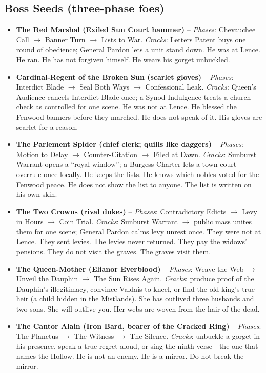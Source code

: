\subsection*{Boss Seeds (three-phase foes)}
\begin{itemize}
  \item \textbf{The Red Marshal (Exiled Sun Court hammer)} -- \emph{Phases}: Chevauchee Call $\rightarrow$ Banner Turn $\rightarrow$ Lists to War. \emph{Cracks}: Letters Patent buys one round of obedience; General Pardon lets a unit stand down. He was at Lence. He ran. He has not forgiven himself. He wears his gorget unbuckled.
  \item \textbf{Cardinal-Regent of the Broken Sun (scarlet gloves)} -- \emph{Phases}: Interdict Blade $\rightarrow$ Seal Both Ways $\rightarrow$ Confessional Leak. \emph{Cracks}: Queen's Audience cancels Interdict Blade once; a Synod Indulgence treats a church check as controlled for one scene. He was not at Lence. He blessed the Fenwood banners before they marched. He does not speak of it. His gloves are scarlet for a reason.
  \item \textbf{The Parlement Spider (chief clerk; quills like daggers)} -- \emph{Phases}: Motion to Delay $\rightarrow$ Counter-Citation $\rightarrow$ Filed at Dawn. \emph{Cracks}: Sunburst Warrant opens a ``royal window''; a Burgess Charter lets a town court overrule once locally. He keeps the lists. He knows which nobles voted for the Fenwood peace. He does not show the list to anyone. The list is written on his own skin.
  \item \textbf{The Two Crowns (rival dukes)} -- \emph{Phases}: Contradictory Edicts $\rightarrow$ Levy in Hours $\rightarrow$ Coin Trial. \emph{Cracks}: Sunburst Warrant $\rightarrow$ public mass unites them for one scene; General Pardon calms levy unrest once. They were not at Lence. They sent levies. The levies never returned. They pay the widows' pensions. They do not visit the graves. The graves visit them.
  \item \textbf{The Queen-Mother (Elianor Everblood)} -- \emph{Phases}: Weave the Web $\rightarrow$ Unveil the Dauphin $\rightarrow$ The Sun Rises Again. \emph{Cracks}: produce proof of the Dauphin's illegitimacy, convince Valdais to kneel, or find the old king's true heir (a child hidden in the Mistlands). She has outlived three husbands and two sons. She will outlive you. Her webs are woven from the hair of the dead.
  \item \textbf{The Cantor Alain (Iron Bard, bearer of the Cracked Ring)} -- \emph{Phases}: The Planctus $\rightarrow$ The Witness $\rightarrow$ The Silence. \emph{Cracks}: unbuckle a gorget in his presence, speak a true regret aloud, or sing the ninth verse---the one that names the Hollow. He is not an enemy. He is a mirror. Do not break the mirror.
\end{itemize}

